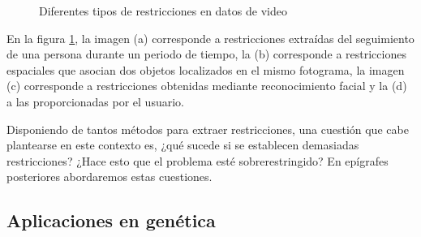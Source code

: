 \begin{figure}[bth]
	\myfloatalign
	\quad
	 \quad
	\quad
	\caption{Diferentes tipos de restricciones en datos de video \cite{Survey:2007}}\label{fig:figure12}
\end{figure}

En la figura \ref{fig:figure12}, la imagen (a) corresponde a restricciones extraídas del seguimiento de una persona durante un periodo de tiempo, la (b) corresponde a restricciones espaciales que asocian dos objetos localizados en el mismo fotograma, la imagen (c) corresponde a restricciones obtenidas mediante reconocimiento facial y la (d) a las proporcionadas por el usuario.

Disponiendo de tantos métodos para extraer restricciones, una cuestión que cabe plantearse en este contexto es, ¿qué sucede si se establecen demasiadas restricciones? ¿Hace esto que el problema esté sobrerestringido? En epígrafes posteriores abordaremos estas cuestiones.

\subsection{Aplicaciones en genética}

